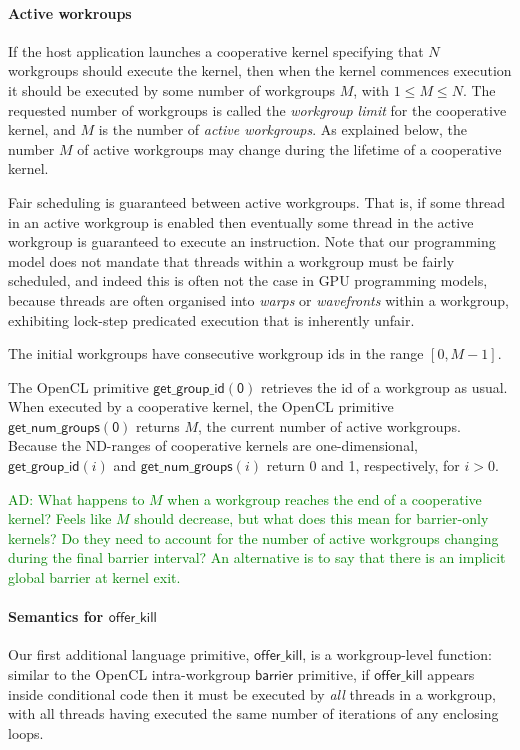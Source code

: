 \documentclass[nocopyrightspace]{sigplanconf-pldi16}
\newcommand{\ADComment}[1]{\textcolor{green}{AD: #1}}
\newcommand{\offerkill}{\mathsf{offer\_kill}}
\newcommand{\getgroupid}[1]{\mathsf{get\_group\_id(#1)}}
\newcommand{\getnumgroups}[1]{\mathsf{get\_num\_groups(#1)}}
\begin{document}
\paragraph{Active workroups}

If the host application launches a cooperative kernel specifying that
$N$ workgroups should execute the kernel, then when the kernel
commences execution it should be executed by some number of workgroups
$M$, with $1\leq M \leq N$.  The requested number of workgroups is
called the \emph{workgroup limit} for the cooperative kernel, and $M$
is the number of \emph{active workgroups}.  As explained below, the
number $M$ of active workgroups may change during the lifetime of a
cooperative kernel.

Fair scheduling is guaranteed between active workgroups.  That is, if
some thread in an active workgroup is enabled then eventually some
thread in the active workgroup is guaranteed to execute an
instruction.  Note that our programming model does not mandate that
threads within a workgroup must be fairly scheduled, and indeed this
is often not the case in GPU programming models, because threads are
often organised into \emph{warps} or \emph{wavefronts} within a
workgroup, exhibiting lock-step predicated execution that is
inherently unfair.

The initial workgroups have consecutive workgroup ids in the range
$[0, M-1]$.

The OpenCL primitive $\getgroupid{0}$ retrieves the id of a
workgroup as usual.  When executed by a cooperative kernel, the OpenCL
primitive $\getnumgroups{0}$ returns $M$, the current number
of active workgroups.  Because the ND-ranges of cooperative kernels
are one-dimensional, $\getgroupid{\mathit{i}}$ and
$\getnumgroups{\mathit{i}}$ return 0 and 1, respectively, for $i >
0$.

\ADComment{What happens to $M$ when a workgroup reaches the end of a
  cooperative kernel?  Feels like $M$ should decrease, but what does
  this mean for barrier-only kernels?  Do they need to account for the
  number of active workgroups changing during the final barrier
  interval?  An alternative is to say that there is an implicit global barrier at kernel exit.}

\paragraph{Semantics for $\offerkill$}

Our first additional language primitive, $\offerkill$, is a
workgroup-level function: similar to the OpenCL intra-workgroup
$\mathsf{barrier}$ primitive, if $\offerkill$ appears inside
conditional code then it must be executed by \emph{all} threads in a
workgroup, with all threads having executed the same number of
iterations of any enclosing loops.
\end{document}
